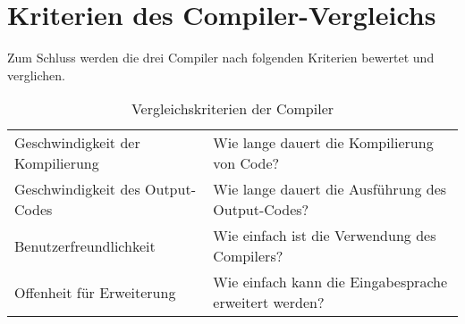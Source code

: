 \section{Kriterien des Compiler-Vergleichs} \label{sec:Vergleichs_Kriterien}
Zum Schluss werden die drei Compiler nach folgenden Kriterien bewertet und verglichen.

\begin{table}[H]
    \centering
    \caption{Vergleichskriterien der Compiler}
    \vspace{3mm} %

    \begin{tabular}{l|l}
    Geschwindigkeit der Kompilierung    & Wie lange dauert die Kompilierung von Code?                       \\
    Geschwindigkeit des Output-Codes    & Wie lange dauert die Ausführung des Output-Codes?                 \\
    Benutzerfreundlichkeit              & Wie einfach ist die Verwendung des Compilers?                     \\
    Offenheit für Erweiterung           & Wie einfach kann die Eingabesprache erweitert werden?                                 
    \end{tabular}
\end{table}

